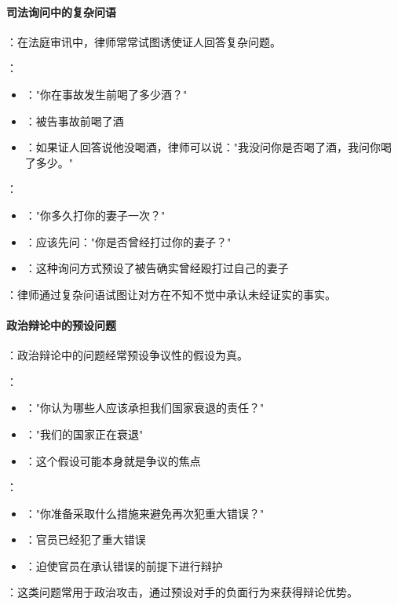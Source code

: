 \paragraph{司法询问中的复杂问语}
\begin{examplebox}[title=司法询问中的复杂问语]
：在法庭审讯中，律师常常试图诱使证人回答复杂问题。

：
\begin{itemize}
  \item {}："你在事故发生前喝了多少酒？"
  \item {}：被告事故前喝了酒
  \item {}：如果证人回答说他没喝酒，律师可以说："我没问你是否喝了酒，我问你喝了多少。"
\end{itemize}

：
\begin{itemize}
  \item {}："你多久打你的妻子一次？"
  \item {}：应该先问："你是否曾经打过你的妻子？"
  \item {}：这种询问方式预设了被告确实曾经殴打过自己的妻子
\end{itemize}

：律师通过复杂问语试图让对方在不知不觉中承认未经证实的事实。
\end{examplebox}

\paragraph{政治辩论中的预设问题}
\begin{examplebox}[title=政治辩论中的预设问题]
：政治辩论中的问题经常预设争议性的假设为真。

：
\begin{itemize}
  \item {}："你认为哪些人应该承担我们国家衰退的责任？"
  \item {}："我们的国家正在衰退"
  \item {}：这个假设可能本身就是争议的焦点
\end{itemize}

：
\begin{itemize}
  \item {}："你准备采取什么措施来避免再次犯重大错误？"
  \item {}：官员已经犯了重大错误
  \item {}：迫使官员在承认错误的前提下进行辩护
\end{itemize}

：这类问题常用于政治攻击，通过预设对手的负面行为来获得辩论优势。
\end{examplebox}

